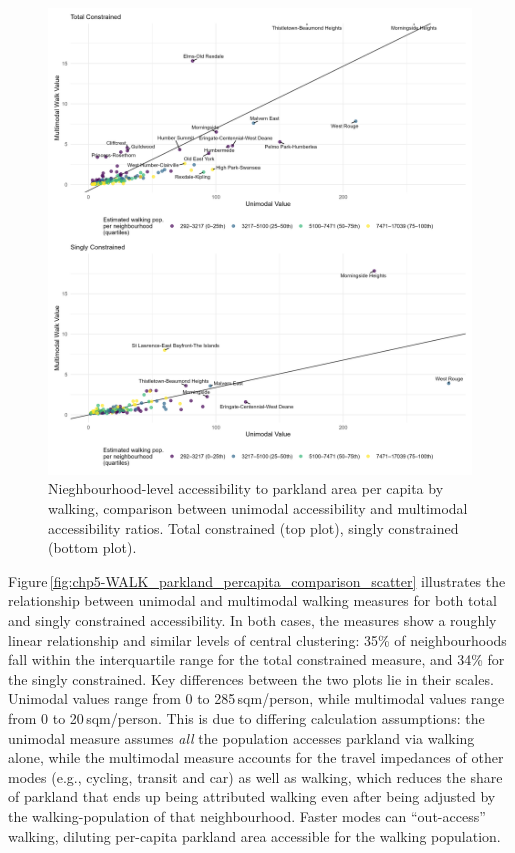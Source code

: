 \documentclass[
11pt, %
oneside, %
english, %
singlespacing, %
]{macthesis} %
\begin{document}
\begin{figure}

{\centering \includegraphics[width=6in]{./data/figures/chp5-WALK_parkland_percapita_comparison_scatter} 

}

\caption{\label{fig:chp5-WALK_parkland_percapita_comparison_scatter}Nieghbourhood-level accessibility to parkland area per capita by walking, comparison between unimodal accessibility and multimodal accessibility ratios. Total constrained (top plot), singly constrained (bottom plot).}\label{fig:unnamed-chunk-80}
\end{figure}

Figure\,\ref{fig:chp5-WALK_parkland_percapita_comparison_scatter} illustrates the relationship between unimodal and multimodal walking measures for both total and singly constrained accessibility. In both cases, the measures show a roughly linear relationship and similar levels of central clustering: 35\% of neighbourhoods fall within the interquartile range for the total constrained measure, and 34\% for the singly constrained. Key differences between the two plots lie in their scales. Unimodal values range from 0 to 285\,sqm/person, while multimodal values range from 0 to 20\,sqm/person. This is due to differing calculation assumptions: the unimodal measure assumes \emph{all} the population accesses parkland via walking alone, while the multimodal measure accounts for the travel impedances of other modes (e.g., cycling, transit and car) as well as walking, which reduces the share of parkland that ends up being attributed walking even after being adjusted by the walking-population of that neighbourhood. Faster modes can ``out-access'' walking, diluting per-capita parkland area accessible for the walking population.
\end{document}
